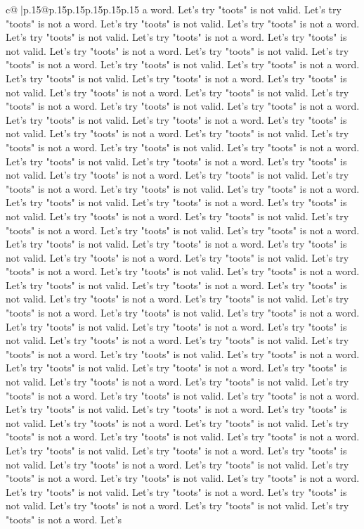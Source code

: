 \documentclass{article}
\begin{document}
{\begin{supertabular}{c@{$\;$}|p{.15\linewidth}@{}p{.15\linewidth}p{.15\linewidth}p{.15\linewidth}p{.15\linewidth}p{.15\linewidth}}
{{{a word. Let's try "toots" is not valid. Let's try "toots" is not a word. Let's try "toots" is not valid. Let's try "toots" is not a word. Let's try "toots" is not valid. Let's try "toots" is not a word. Let's try "toots" is not valid. Let's try "toots" is not a word. Let's try "toots" is not valid. Let's try "toots" is not a word. Let's try "toots" is not valid. Let's try "toots" is not a word. Let's try "toots" is not valid. Let's try "toots" is not a word. Let's try "toots" is not valid. Let's try "toots" is not a word. Let's try "toots" is not valid. Let's try "toots" is not a word. Let's try "toots" is not valid. Let's try "toots" is not a word. Let's try "toots" is not valid. Let's try "toots" is not a word. Let's try "toots" is not valid. Let's try "toots" is not a word. Let's try "toots" is not valid. Let's try "toots" is not a word. Let's try "toots" is not valid. Let's try "toots" is not a word. Let's try "toots" is not valid. Let's try "toots" is not a word. Let's try "toots" is not valid. Let's try "toots" is not a word. Let's try "toots" is not valid. Let's try "toots" is not a word. Let's try "toots" is not valid. Let's try "toots" is not a word. Let's try "toots" is not valid. Let's try "toots" is not a word. Let's try "toots" is not valid. Let's try "toots" is not a word. Let's try "toots" is not valid. Let's try "toots" is not a word. Let's try "toots" is not valid. Let's try "toots" is not a word. Let's try "toots" is not valid. Let's try "toots" is not a word. Let's try "toots" is not valid. Let's try "toots" is not a word. Let's try "toots" is not valid. Let's try "toots" is not a word. Let's try "toots" is not valid. Let's try "toots" is not a word. Let's try "toots" is not valid. Let's try "toots" is not a word. Let's try "toots" is not valid. Let's try "toots" is not a word. Let's try "toots" is not valid. Let's try "toots" is not a word. Let's try "toots" is not valid. Let's try "toots" is not a word. Let's try "toots" is not valid. Let's try "toots" is not a word. Let's try "toots" is not valid. Let's try "toots" is not a word. Let's try "toots" is not valid. Let's try "toots" is not a word. Let's try "toots" is not valid. Let's try "toots" is not a word. Let's try "toots" is not valid. Let's try "toots" is not a word. Let's try "toots" is not valid. Let's try "toots" is not a word. Let's try "toots" is not valid. Let's try "toots" is not a word. Let's try "toots" is not valid. Let's try "toots" is not a word. Let's try "toots" is not valid. Let's try "toots" is not a word. Let's try "toots" is not valid. Let's try "toots" is not a word. Let's try "toots" is not valid. Let's try "toots" is not a word. Let's try "toots" is not valid. Let's try "toots" is not a word. Let's try "toots" is not valid. Let's try "toots" is not a word. Let's try "toots" is not valid. Let's try "toots" is not a word. Let's try "toots" is not valid. Let's try "toots" is not a word. Let's try "toots" is not valid. Let's try "toots" is not a word. Let's try "toots" is not valid. Let's try "toots" is not a word. Let's try "toots" is not valid. Let's try "toots" is not a word. Let's try "toots" is not valid. Let's try "toots" is not a word. Let's }}}
\end{supertabular}}
\end{document}
